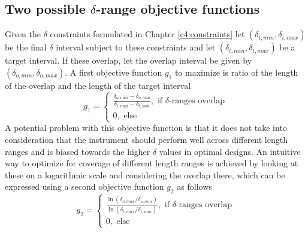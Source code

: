 \documentclass{article}
\newcommand{\targetrange}{$10 \unit{\nano\meter}$ to $5 \unit{\micro\meter}$}
\begin{document}
\subsection{Two possible $\delta$-range objective functions}
\label{c5.2}
Given the $\delta$ constraints formulated in Chapter \ref{c4:constraints} let $(\delta_{i, min},\delta_{i, max})$ be the final $\delta$ interval subject to these constraints and let $(\delta_{t, min},\delta_{t, max})$ be a target interval. If these overlap, let the overlap interval be given by $(\delta_{o, min},\delta_{o, max})$. A first objective function $g_1$ to maximize is ratio of the length of the overlap and the length of the target interval
$$g_1 = \begin{cases}
	\frac{\delta_{o, max}-\delta_{o, min}}{\delta_{t, max} - \delta_{t, min}},\text{ if $\delta$-ranges overlap}\\
	0,\text{ else}
\end{cases}$$
A potential problem with this objective function is that it does not take into consideration that the instrument should perform well across different length ranges and is biased towards the higher $\delta$ values in optimal designs. An intuitive way to optimize for coverage of different length ranges is achieved by looking at these on a logarithmic scale and considering the overlap there, which can be expressed using a second objective function $g_2$ as follows 
$$g_2 = \begin{cases}
	\frac{\ln(\delta_{o, max}/\delta_{o, min})}{\ln(\delta_{t, max}/\delta_{t, min})},\text{ if $\delta$-ranges overlap}\\
	0,\text{ else}
\end{cases}$$
\end{document}
